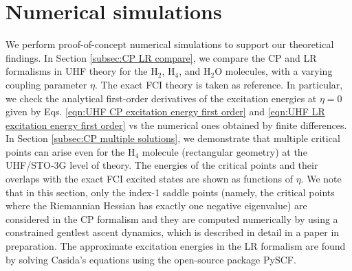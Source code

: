 \documentclass[11pt]{article}
\newcommand{\YHTODO}[1]{{\color{blue}[YH's TODO: #1]}}
\begin{document}
\section{Numerical simulations}
\label{sec:numerics}
We perform proof-of-concept numerical simulations to support our theoretical findings. In Section \ref{subsec:CP LR compare}, we compare the CP and LR formalisms in UHF theory for the H$_2$, H$_4$, and H$_2$O molecules, with a varying coupling parameter $\eta$. The exact FCI theory is taken as reference. In particular, we check the analytical first-order derivatives of the excitation energies at $\eta=0$ given by Eqs. \eqref{eqn:UHF CP excitation energy first order} and \eqref{eqn:UHF LR excitation energy first order} vs the numerical ones obtained by finite differences. In Section \ref{subsec:CP multiple solutions}, we demonstrate that multiple critical points can arise even for the H$_4$ molecule (rectangular geometry) at the UHF/STO-3G level of theory. The energies of the critical points and their overlaps with the exact FCI excited states are shown as functions of $\eta$. We note that in this section, only the index-1 saddle points (namely, the critical points where the Riemannian Hessian has exactly one negative eigenvalue) are considered in the CP formalism and they are computed numerically by using a constrained gentlest ascent dynamics, which is described in detail in a paper in preparation. The approximate excitation energies in the LR formalism are found by solving Casida's equations \supercite{CASIDA1995,Casida1998,Casida2005} using the open-source package PySCF.\supercite{sun2020recent}


\end{document}

